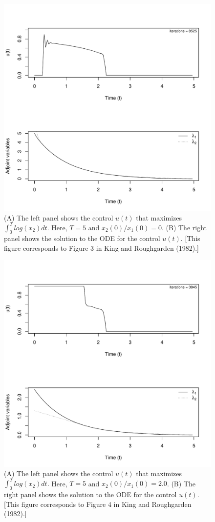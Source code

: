 \documentclass[12pt, oneside]{article}   	%
\begin{document}
 \begin{figure}[h]
   \centering
       \includegraphics[page=1,width=.9\textwidth]{../../figures/forwardBackwardSweep-x1=1-x2=0}  
    \caption{ (A) The left panel shows the control $u(t)$ that maximizes $ \int_{0}^{T} log(x_2) dt. $ Here, $ T=5$ and $x_2(0)/x_1(0) = 0$. (B) The right panel shows the solution to the ODE for the control $u(t)$. [This figure corresponds to Figure 3 in King and Roughgarden (1982).] }
 \label{fig:kingRoughgardenFigure3}
\end{figure}

 \begin{figure}[h]
   \centering
       \includegraphics[page=1,width=.9\textwidth]{../../figures/forwardBackwardSweep-x1=1-x2=2}  
    \caption{ (A) The left panel shows the control $u(t)$ that maximizes $ \int_{0}^{T} log(x_2) dt. $ Here, $ T=5$ and $x_2(0)/x_1(0) = 2.0$. (B) The right panel shows the solution to the ODE for the control $u(t)$. [This figure corresponds to Figure 4 in King and Roughgarden (1982).] }
 \label{fig:kingRoughgardenFigure4}
\end{figure}
\end{document}
